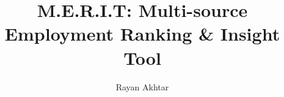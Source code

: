 \documentclass[a4paper, twoside]{report}
\title{M.E.R.I.T: Multi-source Employment Ranking \& Insight Tool}
\author{Rayan Akhtar}
\begin{document}


\begin{abstract}
  
\end{abstract}

\renewcommand{\abstractname}{Acknowledgements}
\begin{abstract}
  
\end{abstract}

\tableofcontents
\listoffigures
\listoftables

\cleardoublepage
{}
\setcounter{page}{1}
\pagestyle{main}











\end{document}
